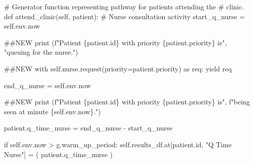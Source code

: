 \documentclass[
  letterpaper,
  DIV=11,
  numbers=noendperiod]{scrreprt}
\newenvironment{Shaded}{\begin{snugshade}}{\end{snugshade}}
\newcommand{\BuiltInTok}[1]{\textcolor[rgb]{0.00,0.23,0.31}{#1}}
\newcommand{\CommentTok}[1]{\textcolor[rgb]{0.37,0.37,0.37}{#1}}
\newcommand{\ControlFlowTok}[1]{\textcolor[rgb]{0.00,0.23,0.31}{#1}}
\newcommand{\ImportTok}[1]{\textcolor[rgb]{0.00,0.46,0.62}{#1}}
\newcommand{\KeywordTok}[1]{\textcolor[rgb]{0.00,0.23,0.31}{#1}}
\newcommand{\NormalTok}[1]{\textcolor[rgb]{0.00,0.23,0.31}{#1}}
\newcommand{\OperatorTok}[1]{\textcolor[rgb]{0.37,0.37,0.37}{#1}}
\newcommand{\SpecialCharTok}[1]{\textcolor[rgb]{0.37,0.37,0.37}{#1}}
\newcommand{\SpecialStringTok}[1]{\textcolor[rgb]{0.13,0.47,0.30}{#1}}
\newcommand{\StringTok}[1]{\textcolor[rgb]{0.13,0.47,0.30}{#1}}
\newcommand{\VariableTok}[1]{\textcolor[rgb]{0.07,0.07,0.07}{#1}}
\begin{document}
\begin{Shaded}
\begin{Highlighting}[]
\CommentTok{\# Generator function representing pathway for patients attending the}
    \CommentTok{\# clinic.}
    \KeywordTok{def}\NormalTok{ attend\_clinic(}\VariableTok{self}\NormalTok{, patient):}
        \CommentTok{\# Nurse consultation activity}
\NormalTok{        start\_q\_nurse }\OperatorTok{=} \VariableTok{self}\NormalTok{.env.now}

        \CommentTok{\#\#NEW}
        \BuiltInTok{print}\NormalTok{ (}\SpecialStringTok{f"Patient }\SpecialCharTok{\{}\NormalTok{patient}\SpecialCharTok{.}\BuiltInTok{id}\SpecialCharTok{\}}\SpecialStringTok{ with priority }\SpecialCharTok{\{}\NormalTok{patient}\SpecialCharTok{.}\NormalTok{priority}\SpecialCharTok{\}}\SpecialStringTok{ is"}\NormalTok{,}
               \StringTok{"queuing for the nurse."}\NormalTok{)}

        \CommentTok{\#\#NEW}
        \ControlFlowTok{with} \VariableTok{self}\NormalTok{.nurse.request(priority}\OperatorTok{=}\NormalTok{patient.priority) }\ImportTok{as}\NormalTok{ req:}
            \ControlFlowTok{yield}\NormalTok{ req}

\NormalTok{            end\_q\_nurse }\OperatorTok{=} \VariableTok{self}\NormalTok{.env.now}

            \CommentTok{\#\#NEW}
            \BuiltInTok{print}\NormalTok{ (}\SpecialStringTok{f"Patient }\SpecialCharTok{\{}\NormalTok{patient}\SpecialCharTok{.}\BuiltInTok{id}\SpecialCharTok{\}}\SpecialStringTok{ with priority }\SpecialCharTok{\{}\NormalTok{patient}\SpecialCharTok{.}\NormalTok{priority}\SpecialCharTok{\}}\SpecialStringTok{ is"}\NormalTok{,}
                   \SpecialStringTok{f"being seen at minute }\SpecialCharTok{\{}\VariableTok{self}\SpecialCharTok{.}\NormalTok{env}\SpecialCharTok{.}\NormalTok{now}\SpecialCharTok{\}}\SpecialStringTok{."}\NormalTok{)}

\NormalTok{            patient.q\_time\_nurse }\OperatorTok{=}\NormalTok{ end\_q\_nurse }\OperatorTok{{-}}\NormalTok{ start\_q\_nurse}

            \ControlFlowTok{if} \VariableTok{self}\NormalTok{.env.now }\OperatorTok{\textgreater{}}\NormalTok{ g.warm\_up\_period:}
                \VariableTok{self}\NormalTok{.results\_df.at[patient.}\BuiltInTok{id}\NormalTok{, }\StringTok{"Q Time Nurse"}\NormalTok{] }\OperatorTok{=}\NormalTok{ (}
\NormalTok{                    patient.q\_time\_nurse}
\NormalTok{                )}


\end{Highlighting}
\end{Shaded}
\end{document}
